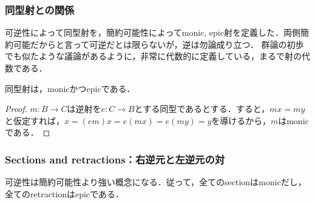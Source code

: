 \documentclass[uplatex, 12pt, dvipdfmx]{jsarticle}
\begin{document}
\subsubsection*{同型射との関係}

可逆性によって同型射を，簡約可能性によってmonic, epic射を定義した．両側簡約可能だからと言って可逆だとは限らないが，逆は勿論成り立つ．
群論の初歩でも似たような議論があるように，非常に代数的に定義している，まるで射の代数である．
\begin{proposition}[可逆な射は簡約可能である]\label{prop-iso_is_monoepi}
    同型射は，monicかつepicである．
\end{proposition}
\begin{proof}
    $m:B\to C$は逆射を$e:C\to B$とする同型であるとする．すると，$mx=my$と仮定すれば，$x=(em)x=e(mx)=e(my)=y$を導けるから，$m$はmonicである．
\end{proof}

\subsubsection{Sections and retractions：右逆元と左逆元の対}
可逆性は簡約可能性より強い概念になる．従って，全てのsectionはmonicだし，全てのretractionはepicである．
\end{document}
